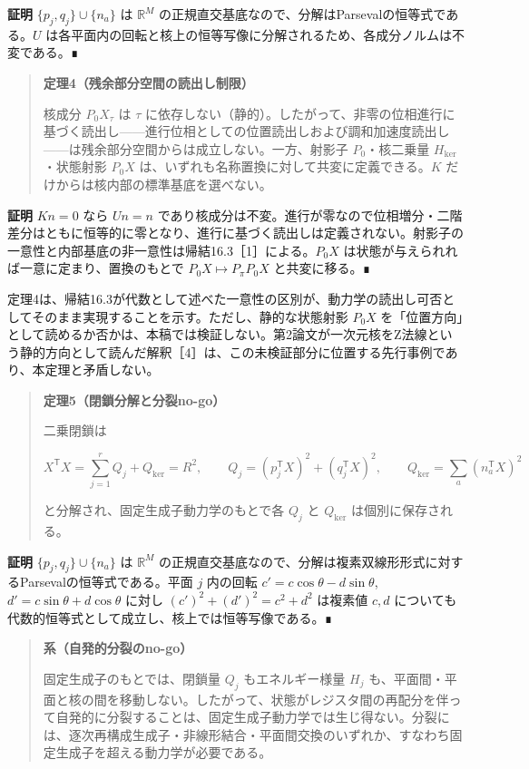\documentclass[
  a4paper,
]{ltjsarticle}
\begin{document}
\textbf{証明} \(\{p_j,q_j\}\cup\{n_a\}\) は \(\mathbb R^M\)
の正規直交基底なので、分解はParsevalの恒等式である。\(U\)
は各平面内の回転と核上の恒等写像に分解されるため、各成分ノルムは不変である。∎

\begin{quote}
\textbf{定理4（残余部分空間の読出し制限）}

核成分 \(P_0X_\tau\) は \(\tau\)
に依存しない（静的）。したがって、非零の位相進行に基づく読出し------進行位相としての位置読出しおよび調和加速度読出し------は残余部分空間からは成立しない。一方、射影子
\(P_0\)・核二乗量 \(H_{\ker}\)・状態射影 \(P_0X\)
は、いずれも名称置換に対して共変に定義できる。\(K\)
だけからは核内部の標準基底を選べない。
\end{quote}

\textbf{証明} \(K n=0\) なら \(Un=n\)
であり核成分は不変。進行が零なので位相増分・二階差分はともに恒等的に零となり、進行に基づく読出しは定義されない。射影子の一意性と内部基底の非一意性は帰結16.3［1］による。\(P_0X\)
は状態が与えられれば一意に定まり、置換のもとで
\(P_0X\mapsto P_\pi P_0X\) と共変に移る。∎

定理4は、帰結16.3が代数として述べた一意性の区別が、動力学の読出し可否としてそのまま実現することを示す。ただし、静的な状態射影
\(P_0X\)
を「位置方向」として読めるか否かは、本稿では検証しない。第2論文が一次元核をZ法線という静的方向として読んだ解釈［4］は、この未検証部分に位置する先行事例であり、本定理と矛盾しない。

\begin{quote}
\textbf{定理5（閉鎖分解と分裂no-go）}

二乗閉鎖は

\[
X^{\mathsf T}X
=\sum_{j=1}^{r}Q_j+Q_{\ker}
=R^2,
\qquad
Q_j=(p_j^{\mathsf T}X)^2+(q_j^{\mathsf T}X)^2,
\qquad
Q_{\ker}=\sum_a(n_a^{\mathsf T}X)^2
\]

と分解され、固定生成子動力学のもとで各 \(Q_j\) と \(Q_{\ker}\)
は個別に保存される。
\end{quote}

\textbf{証明} \(\{p_j,q_j\}\cup\{n_a\}\) は \(\mathbb R^M\)
の正規直交基底なので、分解は複素双線形形式に対するParsevalの恒等式である。平面
\(j\) 内の回転 \(c'=c\cos\theta-d\sin\theta\),
\(d'=c\sin\theta+d\cos\theta\) に対し \((c')^2+(d')^2=c^2+d^2\) は複素値
\(c,d\) についても代数的恒等式として成立し、核上では恒等写像である。∎

\begin{quote}
\textbf{系（自発的分裂のno-go）}

固定生成子のもとでは、閉鎖量 \(Q_j\) もエネルギー様量 \(H_j\)
も、平面間・平面と核の間を移動しない。したがって、状態がレジスタ間の再配分を伴って自発的に分裂することは、固定生成子動力学では生じ得ない。分裂には、逐次再構成生成子・非線形結合・平面間交換のいずれか、すなわち固定生成子を超える動力学が必要である。
\end{quote}
\end{document}
